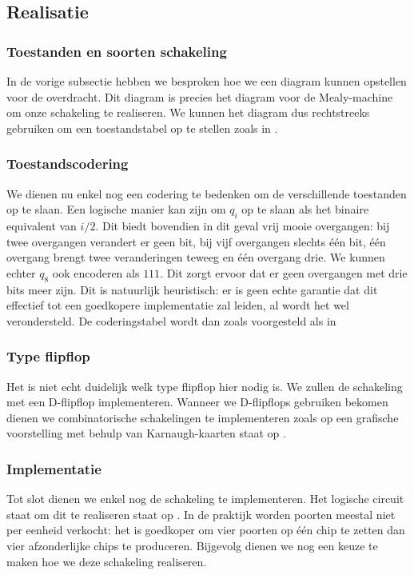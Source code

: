 \subsection{Realisatie}
\subsubsection{Toestanden en soorten schakeling}
In de vorige subsectie hebben we besproken hoe we een diagram kunnen opstellen voor de overdracht. Dit diagram is precies het diagram voor de Mealy-machine om onze schakeling te realiseren. We kunnen het diagram dus rechtstreeks gebruiken om een toestandstabel op te stellen zoals in .
\subsubsection{Toestandscodering}
We dienen nu enkel nog een codering te bedenken om de verschillende toestanden op te slaan. Een logische manier kan zijn om $q_i$ op te slaan als het binaire equivalent van $i/2$. Dit biedt bovendien in dit geval vrij mooie overgangen: bij twee overgangen verandert er geen bit, bij vijf overgangen slechts \'e\'en bit, \'e\'en overgang brengt twee veranderingen teweeg en \'e\'en overgang drie. We kunnen echter $q_8$ ook encoderen als $111$. Dit zorgt ervoor dat er geen overgangen met drie bits meer zijn. Dit is natuurlijk heuristisch: er is geen echte garantie dat dit effectief tot een goedkopere implementatie zal leiden, al wordt het wel verondersteld. De coderingstabel wordt dan zoals voorgesteld als in 
\subsubsection{Type flipflop}
Het is niet echt duidelijk welk type flipflop hier nodig is. We zullen de schakeling met een D-flipflop implementeren.
Wanneer we D-flipflops gebruiken bekomen dienen we combinatorische schakelingen te implementeren zoals op  een grafische voorstelling met behulp van Karnaugh-kaarten staat op .
\subsubsection{Implementatie}
Tot slot dienen we enkel nog de schakeling te implementeren. Het logische circuit staat om dit te realiseren staat op .
In de praktijk worden poorten meestal niet per eenheid verkocht: het is goedkoper om vier poorten op \'e\'en chip te zetten dan vier afzonderlijke chips te produceren. Bijgevolg dienen we nog een keuze te maken hoe we deze schakeling realiseren.
